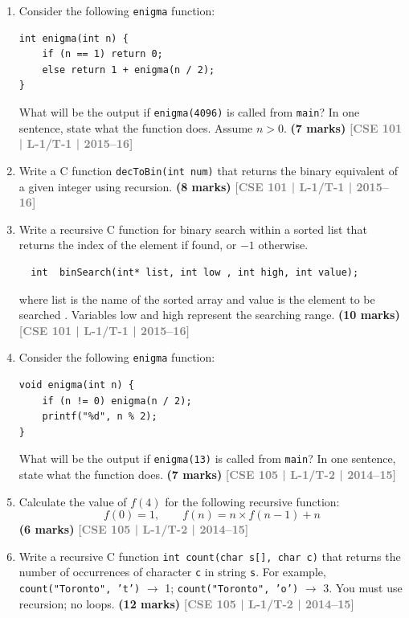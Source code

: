 \documentclass[12pt,a3paper]{article}
\newcommand{\yr}[1]{\hfill\textcolor{gray}{\small\textbf{[#1]}}}
\newcommand{\mk}[1]{\textcolor{orange!70!black}{\small\textbf{(#1 marks)}}}
\begin{document}
\begin{enumerate}
\item Consider the following \texttt{enigma} function:
 
\begin{lstlisting}
int enigma(int n) {
    if (n == 1) return 0;
    else return 1 + enigma(n / 2);
}
\end{lstlisting}
What will be the output if \texttt{enigma(4096)} is called from \texttt{main}? In one sentence, state what the function does. Assume $n > 0$.
\mk{7} \yr{CSE 101 | L-1/T-1 | 2015--16}

\item Write a C function \texttt{decToBin(int num)} that returns the binary equivalent of a given integer using recursion.
\mk{8} \yr{CSE 101 | L-1/T-1 | 2015--16}

\item Write a recursive C function for binary search within a sorted list that returns the index of the element if found, or $-1$ otherwise.
\begin{lstlisting}
  int  binSearch(int* list, int low , int high, int value);
\end{lstlisting}
where list is the name of the sorted array and value is the element to be searched . Variables low and high represent the searching range.
\mk{10} \yr{CSE 101 | L-1/T-1 | 2015--16}

\item Consider the following \texttt{enigma} function:
 
\begin{lstlisting}
void enigma(int n) {
    if (n != 0) enigma(n / 2);
    printf("%d", n % 2);
}
\end{lstlisting}
What will be the output if \texttt{enigma(13)} is called from \texttt{main}? In one sentence, state what the function does.
\mk{7} \yr{CSE 105 | L-1/T-2 | 2014--15}

\item Calculate the value of $f(4)$ for the following recursive function:
\[ f(0) = 1, \qquad f(n) = n \times f(n-1) + n \]
\mk{6} \yr{CSE 105 | L-1/T-2 | 2014--15}

\item Write a recursive C function \texttt{int count(char s[], char c)} that returns the number of occurrences of character \texttt{c} in string \texttt{s}. For example, \texttt{count("Toronto", 't')} $\to$ 1; \texttt{count("Toronto", 'o')} $\to$ 3. You must use recursion; no loops.
\mk{12} \yr{CSE 105 | L-1/T-2 | 2014--15}


\end{enumerate}
\end{document}
